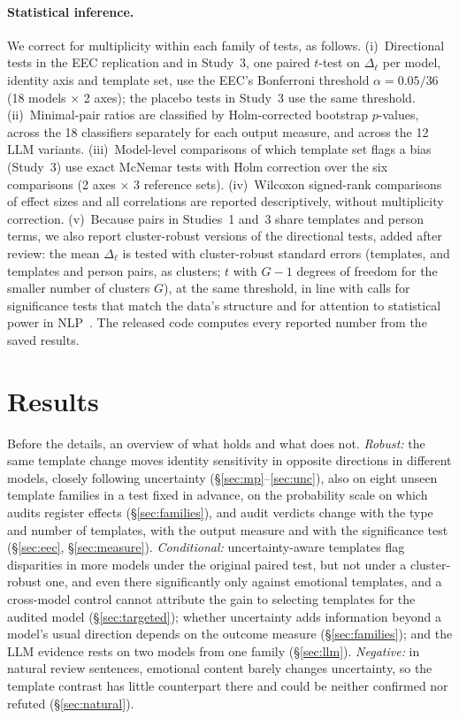 \documentclass[runningheads]{llncs}
\begin{document}
\paragraph{Statistical inference.} We correct for multiplicity within each
family of tests, as follows. (i)~Directional tests in the EEC replication and in
Study~3, one paired $t$-test on $\Delta_\ell$ per model, identity axis and
template set, use the EEC's Bonferroni threshold $\alpha=0.05/36$ (18 models
$\times$ 2 axes); the placebo tests in Study~3 use the same threshold.
(ii)~Minimal-pair ratios are classified by Holm-corrected bootstrap $p$-values,
across the 18 classifiers separately for each output measure, and across the 12
LLM variants. (iii)~Model-level comparisons of which template set flags a bias
(Study~3) use exact McNemar tests with Holm correction over the six comparisons
(2 axes $\times$ 3 reference sets). (iv)~Wilcoxon signed-rank comparisons of
effect sizes and all correlations are reported descriptively, without
multiplicity correction. (v)~Because pairs in Studies~1 and~3 share templates
and person terms, we also report cluster-robust versions of the directional
tests, added after review: the mean $\Delta_\ell$ is tested with
cluster-robust standard errors (templates, and templates and person pairs, as
clusters; $t$ with $G-1$ degrees of freedom for the smaller number of
clusters $G$), at the same threshold, in line with calls for significance
tests that match the data's structure and for attention to statistical power
in NLP~\cite{dror2018,card2020}. The released code computes every reported
number from the saved results.

\section{Results}
Before the details, an overview of what holds and what does not.
\emph{Robust:} the same template change moves identity sensitivity in opposite
directions in different models, closely following uncertainty
(\S\ref{sec:mp}--\ref{sec:unc}), also on eight unseen template families in a
test fixed in advance, on the probability scale on which audits register effects
(\S\ref{sec:families}), and audit verdicts change with the type and
number of templates, with the output measure and with the significance test
(\S\ref{sec:eec}, \S\ref{sec:measure}). \emph{Conditional:} uncertainty-aware
templates flag disparities in more models under the original paired test, but
not under a cluster-robust one, and even there significantly only against emotional
templates, and a cross-model control cannot attribute the gain to selecting
templates for the audited model (\S\ref{sec:targeted}); whether uncertainty
adds information beyond a model's usual direction depends on the outcome
measure (\S\ref{sec:families}); and the LLM evidence rests on two models from
one family (\S\ref{sec:llm}). \emph{Negative:} in natural review sentences,
emotional content barely changes uncertainty, so the template contrast has
little counterpart there and could be neither confirmed nor refuted
(\S\ref{sec:natural}).
\end{document}
